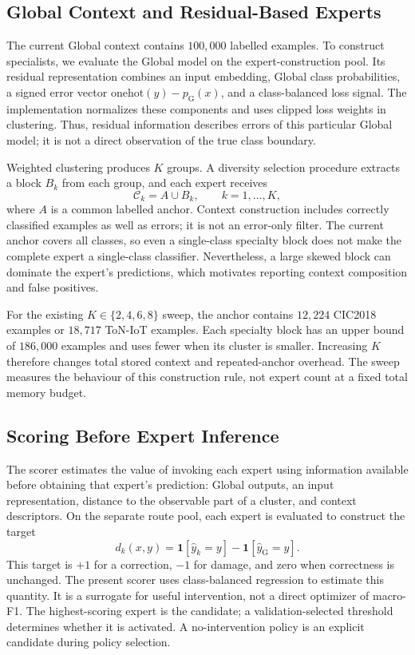 \documentclass[sigconf,anonymous,pbalance]{acmart}
\newcommand{\globalidx}{\mathrm{G}}
\newcommand{\ctx}{\mathcal{C}}
\begin{document}
\subsection{Global Context and Residual-Based Experts}
The current Global context contains $100{,}000$ labelled examples. To construct specialists, we evaluate the Global model on the expert-construction pool. Its residual representation combines an input embedding, Global class probabilities, a signed error vector $\mathrm{onehot}(y)-p_{\globalidx}(x)$, and a class-balanced loss signal. The implementation normalizes these components and uses clipped loss weights in clustering. Thus, residual information describes errors of this particular Global model; it is not a direct observation of the true class boundary.

Weighted clustering produces $K$ groups. A diversity selection procedure extracts a block $B_k$ from each group, and each expert receives
\begin{equation}
 \ctx_k=A\cup B_k,\qquad k=1,\ldots,K,
 \label{eq:context}
\end{equation}
where $A$ is a common labelled anchor. Context construction includes correctly classified examples as well as errors; it is not an error-only filter. The current anchor covers all classes, so even a single-class specialty block does not make the complete expert a single-class classifier. Nevertheless, a large skewed block can dominate the expert's predictions, which motivates reporting context composition and false positives.

For the existing $K\in\{2,4,6,8\}$ sweep, the anchor contains $12{,}224$ CIC2018 examples or $18{,}717$ ToN-IoT examples. Each specialty block has an upper bound of $186{,}000$ examples and uses fewer when its cluster is smaller. Increasing $K$ therefore changes total stored context and repeated-anchor overhead. The sweep measures the behaviour of this construction rule, not expert count at a fixed total memory budget.

\subsection{Scoring Before Expert Inference}
The scorer estimates the value of invoking each expert using information available before obtaining that expert's prediction: Global outputs, an input representation, distance to the observable part of a cluster, and context descriptors. On the separate route pool, each expert is evaluated to construct the target
\begin{equation}
 d_k(x,y)=\mathbf{1}[\hat y_k=y]-\mathbf{1}[\hat y_{\globalidx}=y].
 \label{eq:decisiongain}
\end{equation}
This target is $+1$ for a correction, $-1$ for damage, and zero when correctness is unchanged. The present scorer uses class-balanced regression to estimate this quantity. It is a surrogate for useful intervention, not a direct optimizer of macro-F1. The highest-scoring expert is the candidate; a validation-selected threshold determines whether it is activated. A no-intervention policy is an explicit candidate during policy selection.
\end{document}
